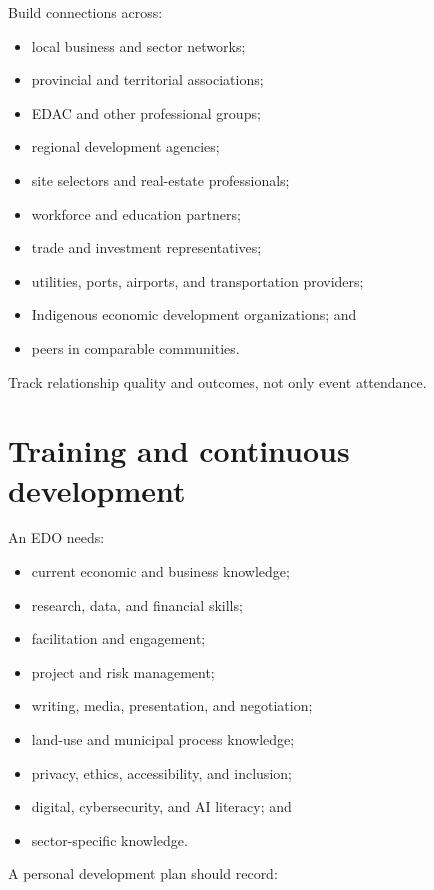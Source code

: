 \documentclass[11pt,letterpaper,oneside,openany]{book}
\begin{document}
Build connections across:


\begin{itemize}
\item local business and sector networks;
\item provincial and territorial associations;
\item EDAC and other professional groups;
\item regional development agencies;
\item site selectors and real-estate professionals;
\item workforce and education partners;
\item trade and investment representatives;
\item utilities, ports, airports, and transportation providers;
\item Indigenous economic development organizations; and
\item peers in comparable communities.
\end{itemize}


Track relationship quality and outcomes, not only event attendance.


\section[Training and continuous development]{Training and continuous development}
An EDO needs:


\begin{itemize}
\item current economic and business knowledge;
\item research, data, and financial skills;
\item facilitation and engagement;
\item project and risk management;
\item writing, media, presentation, and negotiation;
\item land-use and municipal process knowledge;
\item privacy, ethics, accessibility, and inclusion;
\item digital, cybersecurity, and AI literacy; and
\item sector-specific knowledge.
\end{itemize}


A personal development plan should record:
\end{document}
